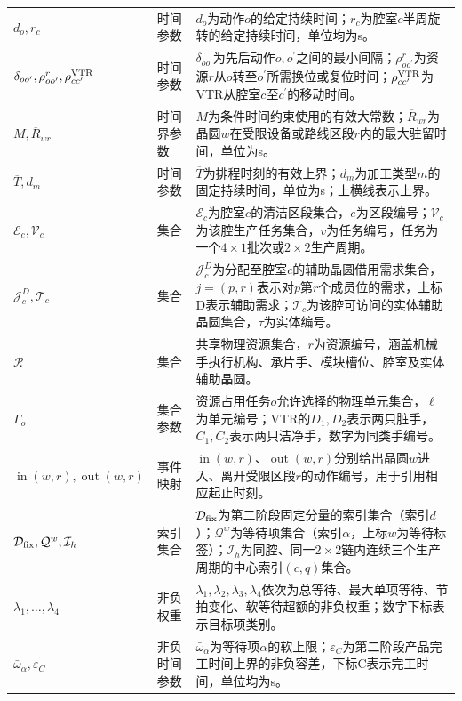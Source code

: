 \documentclass[final,5p,times,twocolumn]{elsarticle}
\begin{document}
\begin{table}[!t]
\begin{tabular}{C{0.23\textwidth}C{0.10\textwidth}C{0.61\textwidth}}
$d_o,r_c$ & 时间参数 & $d_o$为动作$o$的给定持续时间；$r_c$为腔室$c$半周旋转的给定持续时间，单位均为s。\\
$\delta_{oo'},\rho^r_{oo'},\rho^{\rm VTR}_{cc'}$ & 时间参数 & $\delta_{oo^{\prime}}$为先后动作$o,o^{\prime}$之间的最小间隔；$\rho^r_{oo^{\prime}}$为资源$r$从$o$转至$o^{\prime}$所需换位或复位时间；$\rho^{\rm VTR}_{cc^{\prime}}$为VTR从腔室$c$至$c^{\prime}$的移动时间。\\
$M,\overline R_{wr}$ & 时间界参数 & $M$为条件时间约束使用的有效大常数；$\overline R_{wr}$为晶圆$w$在受限设备或路线区段$r$内的最大驻留时间，单位为s。\\
$\overline T,d_m$ & 时间参数 & $\overline T$为排程时刻的有效上界；$d_m$为加工类型$m$的固定持续时间，单位为s；上横线表示上界。\\
$\mathcal E_c,\mathcal V_c$ & 集合 & $\mathcal E_c$为腔室$c$的清洁区段集合，$e$为区段编号；$\mathcal V_c$为该腔生产任务集合，$v$为任务编号，任务为一个$4\times1$批次或$2\times2$生产周期。\\
$\mathcal J_c^D,\mathcal T_c$ & 集合 & $\mathcal J_c^D$为分配至腔室$c$的辅助晶圆借用需求集合，$j=(p,r)$表示对$p$第$r$个成员位的需求，上标D表示辅助需求；$\mathcal T_c$为该腔可访问的实体辅助晶圆集合，$\tau$为实体编号。\\
$\mathcal R$ & 集合 & 共享物理资源集合，$r$为资源编号，涵盖机械手执行机构、承片手、模块槽位、腔室及实体辅助晶圆。\\
$\Gamma_o$ & 集合参数 & 资源占用任务$o$允许选择的物理单元集合，$\ell$为单元编号；VTR的$D_1,D_2$表示两只脏手，$C_1,C_2$表示两只洁净手，数字为同类手编号。\\
$\operatorname{in}(w,r),\operatorname{out}(w,r)$ & 事件映射 & $\operatorname{in}(w,r)$、$\operatorname{out}(w,r)$分别给出晶圆$w$进入、离开受限区段$r$的动作编号，用于引用相应起止时刻。\\
$\mathcal D_{\rm fix},\mathcal Q^w,\mathcal I_h$ & 索引集合 & $\mathcal D_{\rm fix}$为第二阶段固定分量的索引集合（索引$d$）；$\mathcal Q^w$为等待项集合（索引$\alpha$，上标$w$为等待标签）；$\mathcal I_h$为同腔、同一$2\times2$链内连续三个生产周期的中心索引$(c,q)$集合。\\
$\lambda_1,\ldots,\lambda_4$ & 非负权重 & $\lambda_1,\lambda_2,\lambda_3,\lambda_4$依次为总等待、最大单项等待、节拍变化、软等待超额的非负权重；数字下标表示目标项类别。\\
$\bar\omega_\alpha,\varepsilon_C$ & 非负时间参数 & $\bar\omega_\alpha$为等待项$\alpha$的软上限；$\varepsilon_C$为第二阶段产品完工时间上界的非负容差，下标C表示完工时间，单位均为s。\\
\bottomrule
\end{tabular}
\end{table}
\end{document}
